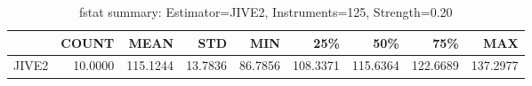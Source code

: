 \begin{table}[ht]
\centering
\caption{fstat summary: Estimator=JIVE2, Instruments=125, Strength=0.20}
\begin{tabular}{lrrrrrrrr}
\toprule
 & COUNT & MEAN & STD & MIN & 25\% & 50\% & 75\% & MAX \\
\midrule
JIVE2 & 10.0000 & 115.1244 & 13.7836 & 86.7856 & 108.3371 & 115.6364 & 122.6689 & 137.2977 \\
\bottomrule
\end{tabular}
\end{table}
